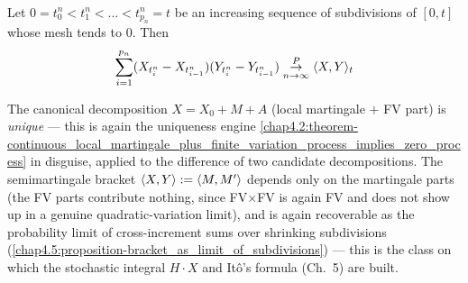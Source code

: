 \begin{proposition} \label{chap4.5:proposition-bracket_as_limit_of_subdivisions}
 \\
Let $0=t_0^n<t_1^n<...<t_{p_n}^n=t$ be an increasing sequence of subdivisions of $[0,t]$ whose mesh tends to $0$. Then
$$\sum_{i=1}^{p_n}(X_{t_i^n}-X_{t_{i-1}^n})(Y_{t_i^n}-Y_{t_{i-1}^n})\overset{P}{\underset{n\to\infty}{\to}}\langle X,Y\rangle_t
$$

\end{proposition}
\begin{quizbox} The canonical decomposition $X=X_0+M+A$ (local martingale $+$ FV part) is \emph{unique} --- this is again the uniqueness engine \cref{chap4.2:theorem-continuous_local_martingale_plus_finite_variation_process_implies_zero_process} in disguise, applied to the difference of two candidate decompositions. The semimartingale bracket $\langle X,Y\rangle:=\langle M,M'\rangle$ depends only on the martingale parts (the FV parts contribute nothing, since FV$\times$FV is again FV and does not show up in a genuine quadratic-variation limit), and is again recoverable as the probability limit of cross-increment sums over shrinking subdivisions (\cref{chap4.5:proposition-bracket_as_limit_of_subdivisions}) --- this is the class on which the stochastic integral $H\cdot X$ and Itô's formula (Ch.\ 5) are built. \end{quizbox}
